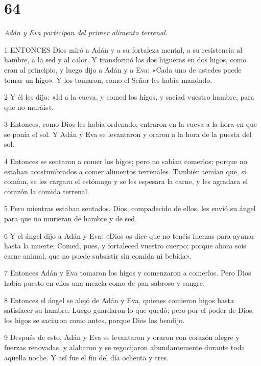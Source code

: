 \chapter{64}

\par \textit{Adán y Eva participan del primer alimento terrenal.}

\par 1 ENTONCES Dios miró a Adán y a su fortaleza mental, a su resistencia al hambre, a la sed y al calor. Y transformó las dos higueras en dos higos, como eran al principio, y luego dijo a Adán y a Eva: «Cada uno de ustedes puede tomar un higo». Y los tomaron, como el Señor les había mandado.

\par 2 Y él les dijo: «Id a la cueva, y comed los higos, y saciad vuestro hambre, para que no muráis».

\par 3 Entonces, como Dios les había ordenado, entraron en la cueva a la hora en que se ponía el sol. Y Adán y Eva se levantaron y oraron a la hora de la puesta del sol.

\par 4 Entonces se sentaron a comer los higos; pero no sabían comerlos; porque no estaban acostumbrados a comer alimentos terrenales. También temían que, si comían, se les cargara el estómago y se les espesara la carne, y les agradara el corazón la comida terrenal.

\par 5 Pero mientras estaban sentados, Dios, compadecido de ellos, les envió su ángel para que no murieran de hambre y de sed.

\par 6 Y el ángel dijo a Adán y Eva: «Dios os dice que no tenéis fuerzas para ayunar hasta la muerte; Comed, pues, y fortaleced vuestro cuerpo; porque ahora sois carne animal, que no puede subsistir sin comida ni bebida».

\par 7 Entonces Adán y Eva tomaron los higos y comenzaron a comerlos. Pero Dios había puesto en ellos una mezcla como de pan sabroso y sangre.

\par 8 Entonces el ángel se alejó de Adán y Eva, quienes comieron higos hasta satisfacer su hambre. Luego guardaron lo que quedó; pero por el poder de Dios, los higos se saciaron como antes, porque Dios los bendijo.

\par 9 Después de esto, Adán y Eva se levantaron y oraron con corazón alegre y fuerzas renovadas, y alabaron y se regocijaron abundantemente durante toda aquella noche. Y así fue el fin del día ochenta y tres.

